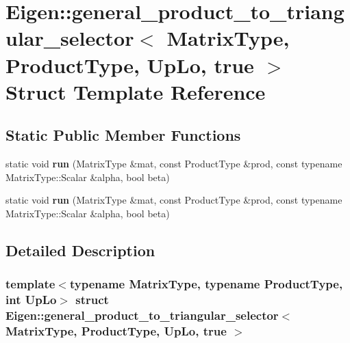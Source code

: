 \hypertarget{struct_eigen_1_1general__product__to__triangular__selector_3_01_matrix_type_00_01_product_type_00_01_up_lo_00_01true_01_4}{}\section{Eigen\+:\+:general\+\_\+product\+\_\+to\+\_\+triangular\+\_\+selector$<$ Matrix\+Type, Product\+Type, Up\+Lo, true $>$ Struct Template Reference}
\label{struct_eigen_1_1general__product__to__triangular__selector_3_01_matrix_type_00_01_product_type_00_01_up_lo_00_01true_01_4}
\subsection*{Static Public Member Functions}
\begin{DoxyCompactItemize}
\item 
\mbox{\label{struct_eigen_1_1general__product__to__triangular__selector_3_01_matrix_type_00_01_product_type_00_01_up_lo_00_01true_01_4_a3102a63fe7b1c0bfaa90b2acf9fa025f}} 
static void {\bfseries run} (Matrix\+Type \&mat, const Product\+Type \&prod, const typename Matrix\+Type\+::\+Scalar \&alpha, bool beta)
\item 
\mbox{\label{struct_eigen_1_1general__product__to__triangular__selector_3_01_matrix_type_00_01_product_type_00_01_up_lo_00_01true_01_4_a3102a63fe7b1c0bfaa90b2acf9fa025f}} 
static void {\bfseries run} (Matrix\+Type \&mat, const Product\+Type \&prod, const typename Matrix\+Type\+::\+Scalar \&alpha, bool beta)
\end{DoxyCompactItemize}


\subsection{Detailed Description}
\subsubsection*{template$<$typename Matrix\+Type, typename Product\+Type, int Up\+Lo$>$\newline
struct Eigen\+::general\+\_\+product\+\_\+to\+\_\+triangular\+\_\+selector$<$ Matrix\+Type, Product\+Type, Up\+Lo, true $>$}



